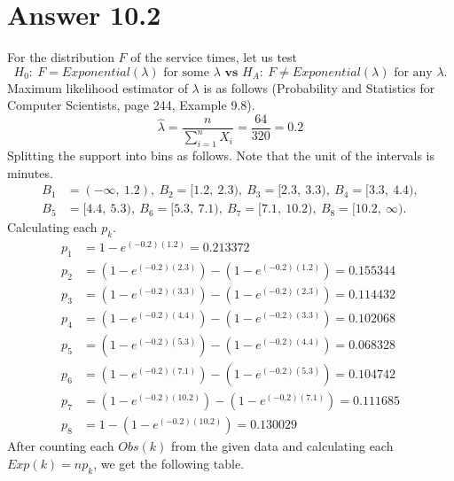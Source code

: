 \documentclass[11pt]{article}
\begin{document}
\section*{Answer 10.2}
For the distribution $F$ of the service times, let us test
\begin{equation*}
	H_0: \ F = Exponential(\lambda)\text{ for some }\lambda \textbf{ vs } H_A: \ F \neq Exponential(\lambda)\text{ for any }\lambda.
\end{equation*}
Maximum likelihood estimator of $\lambda$ is as follows (Probability and Statistics for Computer Scientists, page 244, Example 9.8).
\begin{equation}
	\hat{\lambda} = \frac{n}{\sum\limits_{i = 1}^{n} X_i} = \frac{64}{320} = 0.2
\end{equation}
Splitting the support into bins as follows. Note that the unit of the intervals is minutes.
\begin{equation}
\begin{split}
	B_1 & = (-\infty, \ 1.2), \ B_2 = [1.2, \ 2.3), \ B_3 = [2.3, \ 3.3), \ B_4 = [3.3, \ 4.4),\\
	B_5 & = [4.4, \ 5.3), \ B_6 = [5.3, \ 7.1), \ B_7 = [7.1, \ 10.2), \ B_8 = [10.2, \ \infty).
\end{split}
\end{equation}
Calculating each $p_k$.
\begin{equation}
\begin{split}
	p_1 & = 1 - e^{(-0.2)(1.2)} = 0.213372 \\
	p_2 & = (1 - e^{(-0.2)(2.3)}) - (1 - e^{(-0.2)(1.2)}) = 0.155344 \\
	p_3 & = (1 - e^{(-0.2)(3.3)}) - (1 - e^{(-0.2)(2.3)}) =  0.114432 \\
	p_4 & = (1 - e^{(-0.2)(4.4)}) - (1 - e^{(-0.2)(3.3)}) = 0.102068 \\
	p_5 & = (1 - e^{(-0.2)(5.3)}) - (1 - e^{(-0.2)(4.4)}) = 0.068328 \\
	p_6 & = (1 - e^{(-0.2)(7.1)}) - (1 - e^{(-0.2)(5.3)}) = 0.104742 \\
	p_7 & = (1 - e^{(-0.2)(10.2)}) - (1 - e^{(-0.2)(7.1)}) = 0.111685 \\
	p_8 & = 1 - (1 - e^{(-0.2)(10.2)}) =  0.130029
\end{split}
\end{equation}
After counting each $Obs(k)$ from the given data and calculating each $Exp(k) = np_k$, we get the following table.
\end{document}
